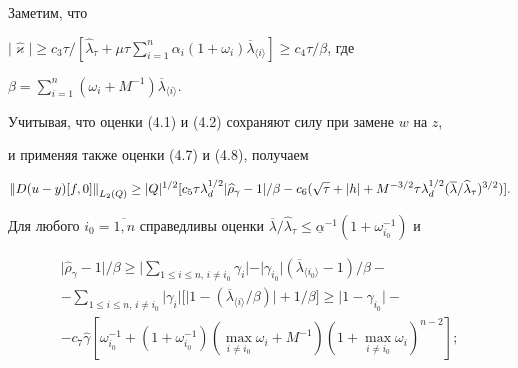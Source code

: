 Заметим, что 


$\vert\widehat\varkappa\vert\ge c_3\tau/[\widehat\lambda_\tau+


\mu\tau\sum_{i=1}^n\alpha_i(1+\omega_i)\overline\lambda_{\langle i\rangle}]


\ge c_4\tau/\beta$, где 


$\beta=\sum_{i=1}^n(\omega_i+M^{-1})\overline\lambda_{\langle i\rangle}$.





Учитывая, что оценки (4.1) и (4.2) сохраняют силу при замене $w$ на $z$, 


и применяя также оценки (4.7) и (4.8), получаем


\begin{equation}


\nord u y f 0\ge\vert Q\vert^{1/2}[c_5\tau\lambda_d^{1/2}


\vert\widehat\rho_\gamma-1\vert/\beta-


c_6(\sqrt\tau+\vert h\vert+M^{-3/2}\tau


\lambda_d^{1/2}(\overline\lambda/\widehat\lambda_\tau)^{3/2})].


\end{equation}


Для любого $i_0=\overline{1,n}$ справедливы оценки $\overline\lambda/


\widehat\lambda_\tau\le\underline\alpha^{-1}(1+\omega_{i_0}^{-1})$ и


\begin{gather*}


\vert\widehat\rho_\gamma-1\vert/\beta\ge\biggr\vert


\sum_{1\le i\le n,\,i\ne i_0}\gamma_i\biggr\vert-\vert\gamma_{i_0}


\vert(\overline\lambda_{\langle i_0\rangle}-1)/\beta- \\


%


-\sum_{1\le i\le n,\,i\ne i_0}\vert\gamma_i\vert\bigl[\vert 1-


(\overline\lambda_{\langle i\rangle}/\beta)\vert+1/\beta\bigr]\ge


\vert 1-\gamma_{i_0}\vert- \\


-c_7\widehat\gamma[\omega_{i_0}^{-1}+(1+\omega_{i_0}^{-1})({\max}_{i\ne i_0}


\omega_i+M^{-1})(1+{\max}_{i\ne i_0}\omega_i)^{n-2}];


\end{gather*}


